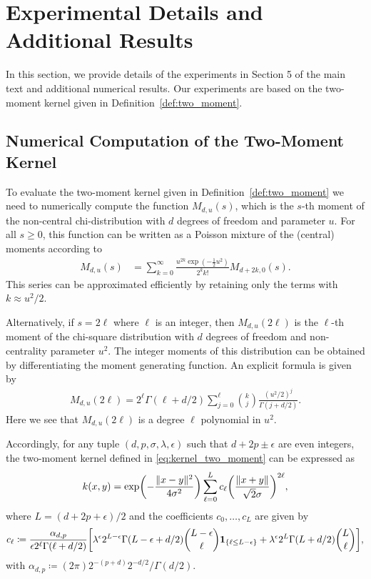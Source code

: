 \documentclass{article}
\theoremstyle{definition}
\newcommand{\eps}{\epsilon}
\let\originalleft\left
\let\originalright\right
\renewcommand{\left}{\mathopen{}\mathclose\bgroup\originalleft}
\renewcommand{\right}{\aftergroup\egroup\originalright}
\begin{document}
\section{Experimental Details and Additional Results}
In this section, we provide details of the experiments in Section 5 of the main text and additional numerical results.  Our experiments are based on the two-moment kernel given in Definition~\ref{def:two_moment}.

\subsection{Numerical Computation of the Two-Moment Kernel}\label{sec_kernel_numerical_computation}
To evaluate the two-moment kernel given in Definition~\ref{def:two_moment} we need to numerically compute the function $M_{d,u}(s)$, which is the $s$-th moment of the non-central chi-distribution with $d$ degrees of freedom and parameter $u$.  For all $s \ge 0$, this function can be written as a Poisson mixture of the (central) moments according to 
\begin{align}\label{eq_app_Mdu}
M_{d,u}(s)  & =\sum _{k=0}^{\infty }\frac {u^{2k} \exp(  - \frac{ 1}{2} u^2) }{2^k k!} M_{d+2k,0}( s).
\end{align}
This series can be approximated efficiently by retaining only the terms with $k \approx u^2 /2 $. 

Alternatively, if $s = 2\ell$ where $\ell$ is an integer, then $M_{d,u}(2\ell)$ is the $\ell$-th moment of the chi-square distribution with $d$ degrees of freedom and non-centrality parameter $u^2$. The integer moments of this distribution can be obtained by differentiating the moment generating function. An explicit formula is given by \cite[pg.~448]{johnson1995continuous}
\begin{align}
M_{d,u}(2\ell) = 2^{\ell} \Gamma( \ell + d/2)  \sum_{j=0}^\ell \binom{k}{j} \frac{ (u^2/2)^j}{ \Gamma( j + d/2)}.
\end{align}
Here we see that $M_{d,u}(2\ell)$ is a degree $\ell$ polynomial in $u^2$. 


Accordingly, for any tuple $(d,p,\sigma, \lambda, \eps)$ such that $d +2p \pm \eps$ are even integers, the two-moment kernel defined in \eqref{eq:kernel_two_moment} can be expressed as
\begin{align}
    k(x,y)   = \exp\left( - \frac{ \|x-y\|^2}{4 \sigma^2} \right) \sum_{\ell=0}^{L}  c_\ell \left( \frac{\|x + y\|}{\sqrt{2}\sigma} \right)^{2\ell},
\end{align}
where $L  = (d + 2p + \eps)/2$ and the coefficients $c_0, \dots, c_{L}$ are given by
\begin{align}
    c_\ell \coloneqq  \frac{\alpha_{d,p}}{\eps 2^\ell \Gamma(\ell  + d/2)}  \left[ \lambda^\eps 2^{L-\eps} \Gamma( L - \eps  + d/2) \binom{L - \eps}{\ell} \boldsymbol{1}_{\{\ell \le L - \eps\}}   + \lambda^{\eps} 2^{L} \Gamma( L + d/2) \binom{L}{\ell} \right],
\end{align}
with $\alpha_{d,p} \coloneqq  (2 \pi) 2^{-(p+d)} 2^{-d/2}/\Gamma(d/2)$.
\end{document}
